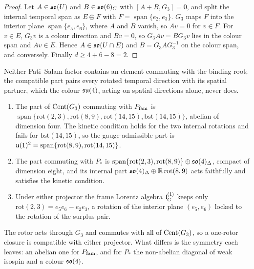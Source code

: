 \begin{proof}
Let $A\in\mathfrak{so}(U)$ and $B\in\mathfrak{so}(6)_C$ with $[A+B,G_3]=0$, and split the internal temporal span as $E\oplus F$ with $F=\operatorname{span}\{e_2,e_3\}$. $G_3$ maps
$F$ into the interior plane $\operatorname{span}\{e_5,e_6\}$, where $A$ and $B$ vanish, so $Av=0$ for $v\in F$. For $v\in E$, $G_3v$ is a colour direction
and $Bv=0$, so $G_3Av=BG_3v$ lies in the colour span and $Av\in E$. Hence $A\in\mathfrak{so}(U\cap E)$ and $B=G_3AG_3^{-1}$ on the colour span, and conversely.
Finally $d\ge4+6-8=2$.
\end{proof}

Neither Pati--Salam factor contains an element commuting with the binding root; the compatible part pairs every rotated temporal direction with
its spatial partner, which the colour $\mathfrak{su}(4)$, acting on spatial directions alone, never does.

\begin{theorem}
\label{thm:survive}
\begin{enumerate}[label=(\roman*),leftmargin=2.2em]
\item The part of $\operatorname{Cent}(G_3)$ commuting with $P_{\rm fam}$ is $\operatorname{span}\{\mathrm{rot}(2,3),\mathrm{rot}(8,9),\mathrm{rot}(14,15),\mathrm{bst}(14,15)\}$,
abelian of dimension four. The kinetic condition holds for the two internal rotations and fails for $\mathrm{bst}(14,15)$, so the gauge-admissible
part is $\mathfrak{u}(1)^2=\operatorname{span}\{\mathrm{rot}(8,9),\mathrm{rot}(14,15)\}$.
\item The part commuting with $P_*$ is $\operatorname{span}\{\mathrm{rot}(2,3),\mathrm{rot}(8,9)\}\oplus\mathfrak{so}(4)_\Delta$, compact of dimension eight, and its
internal part $\mathfrak{so}(4)_\Delta\oplus\mathbb{R}\,\mathrm{rot}(8,9)$ acts faithfully and satisfies the kinetic condition.
\item Under either projector the frame Lorentz algebra $\mathfrak l_G^{(1)}$ keeps only $\mathrm{rot}(2,3)=e_5e_6-e_2e_3$, a rotation of the interior plane
$(e_5,e_6)$ locked to the rotation of the surplus pair.
\end{enumerate}
\end{theorem}

The rotor acts through $G_3$ and commutes with all of $\operatorname{Cent}(G_3)$, so a one-rotor closure is compatible with either projector. What differs is the
symmetry each leaves: an abelian one for $P_{\rm fam}$, and for $P_*$ the non-abelian diagonal of weak isospin and a colour $\mathfrak{so}(4)$.

